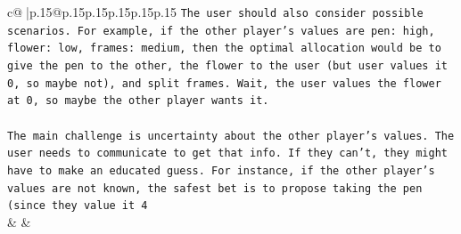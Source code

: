 \documentclass{article}
\begin{document}
{\begin{supertabular}{c@{$\;$}|p{.15\linewidth}@{}p{.15\linewidth}p{.15\linewidth}p{.15\linewidth}p{.15\linewidth}p{.15\linewidth}}
{{{\texttt{The user should also consider possible scenarios. For example, if the other player's values are pen: high, flower: low, frames: medium, then the optimal allocation would be to give the pen to the other, the flower to the user (but user values it 0, so maybe not), and split frames. Wait, the user values the flower at 0, so maybe the other player wants it. } \\
\\ 
\texttt{The main challenge is uncertainty about the other player's values. The user needs to communicate to get that info. If they can't, they might have to make an educated guess. For instance, if the other player's values are not known, the safest bet is to propose taking the pen (since they value it 4} \\
            }
        }
    }
    & & \\ \\


\end{supertabular}}
\end{document}
